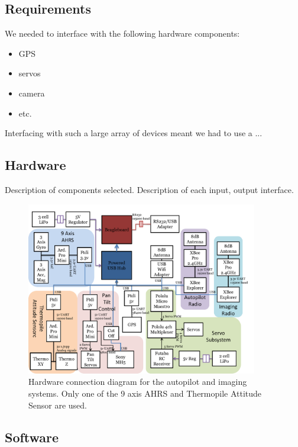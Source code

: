 \documentclass[10pt]{report}
\begin{document}
\subsection{Requirements}

We needed to interface with the following hardware components:
\begin{itemize}
	\setlength{\itemsep}{0cm}
	\setlength{\parskip}{0cm}
	\item GPS
	\item servos
	\item camera
	\item etc.
\end{itemize}

Interfacing with such a large array of devices meant we had to use a ...

\subsection{Hardware}
Description of components selected.
Description of each input, output interface.
\begin{figure}
	\centering
	\includegraphics[width=0.9\textwidth]{../images/hardware_conn_diagram.pdf}
	\caption{Hardware connection diagram for the autopilot and imaging systems. Only one of the 9 axis AHRS and Thermopile Attitude Sensor are used.}
	\label{fig:hardware_conn_diagram}
\end{figure}

\subsection{Software}
\label{sec:autopilot_software}
\end{document}
